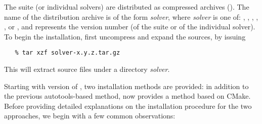 The {\sundials} suite (or individual solvers) are distributed as
compressed archives (). The name of the distribution
archive is of the form {\em solver}, where {\em
solver} is one of: , , , ,
, or , and  represents the version number
(of the {\sundials} suite or of the individual solver).
To begin the installation, first uncompress and expand the sources, by issuing
\begin{verbatim}
   % tar xzf solver-x.y.z.tar.gz
\end{verbatim}
This will extract source files under a directory {\em solver}.


Starting with version  of {\sundials}, two installation methods are provided: in addition to the previous autotools-based
method, {\sundials} now provides a method based on CMake. Before providing detailed explanations on the installation procedure
for the two approaches, we begin with a few common observations:
